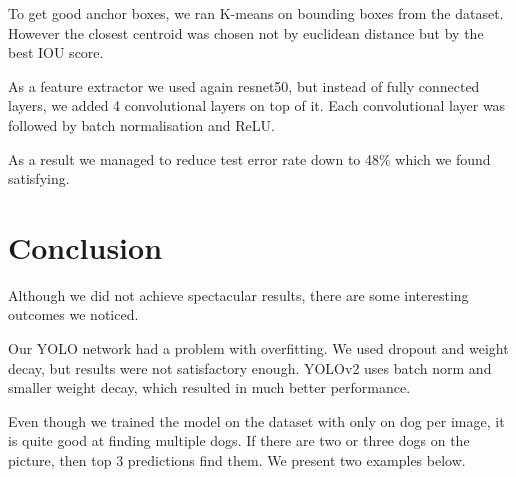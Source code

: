 \documentclass{article}
\begin{document}
To get good anchor boxes, we ran K-means on bounding boxes from the dataset. However the closest centroid was chosen not by euclidean distance but by the best IOU score. 

As a feature extractor we used again resnet50, but instead of fully connected layers, we added 4 convolutional layers on top of it. Each convolutional layer was followed by batch normalisation and ReLU.

As a result we managed to reduce test error rate down to 48\% which we found satisfying.


\section*{Conclusion}

Although we did not achieve spectacular results, there are some interesting outcomes we noticed.

Our YOLO network had a problem with overfitting. We used dropout and weight decay, but results were not satisfactory enough. YOLOv2 uses batch norm and smaller weight decay, which resulted in much better performance.

Even though we trained the model on the dataset with only on dog per image, it is quite good at finding multiple dogs. If there are two or three dogs on the picture, then top 3 predictions find them. We present two examples below.
\end{document}
